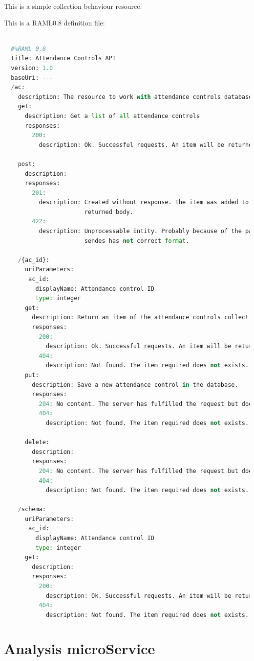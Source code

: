 This is a simple collection behaviour resource.

This is a RAML0.8 definition file:

\begin{lstlisting}[language=python,frame=none]

  #%RAML 0.8
  title: Attendance Controls API
  version: 1.0
  baseUri: ---
  /ac:
    description: The resource to work with attendance controls database saved-
    get:
      description: Get a list of all attendance controls
      responses:
        200:
          description: Ok. Successful requests. An item will be returned.

    post:
      description:
      responses:
        201:
          description: Created without response. The item was added to database will not
                       returned body.
        422:
          description: Unprocessable Entity. Probably because of the payload
                       sendes has not correct format.

    /{ac_id}:
      uriParameters:
       ac_id:
         displayName: Attendance control ID
         type: integer
      get:
        description: Return an item of the attendance controls collection.
        responses:
          200:
            description: Ok. Successful requests. An item will be returned.
          404:
            description: Not found. The item required does not exists.
      put:
        description: Save a new attendance control in the database.
        responses:
          204: No content. The server has fulfilled the request but does not need to return an entity-body.
          404:
            description: Not found. The item required does not exists.

      delete:
        description:
        responses:
          204: No content. The server has fulfilled the request but does not need to return an entity-body.
          404:
            description: Not found. The item required does not exists.

    /schema:
      uriParameters:
       ac_id:
         displayName: Attendance control ID
         type: integer
      get:
        description:
        responses:
          200:
            description: Ok. Successful requests. An item will be returned.
          404:
            description: Not found. The item required does not exists.

\end{lstlisting}



\section{Analysis microService}

